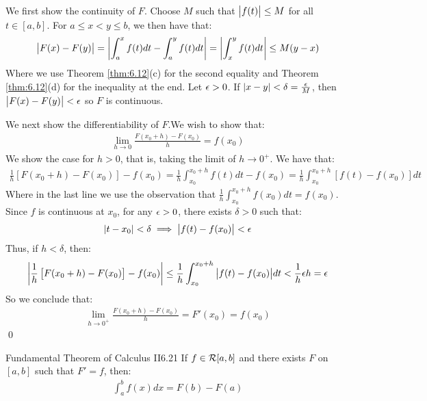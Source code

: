 \begin{nproof}
    We first show the continuity of $F$. Choose $M$ such that $\abs{f(t)} \leq M$ for all $t \in [a, b]$. For $a \leq x < y \leq b$, we then have that:
    \begin{align*}
        \abs{F(x) - F(y)} = \abs{\int_a^xf(t)dt - \int_a^yf(t)dt} = \abs{\int_x^y f(t)dt} \leq M(y - x)
    \end{align*}
    Where we use Theorem \ref{thm:6.12}(c) for the second equality and Theorem \ref{thm:6.12}(d) for the inequality at the end. Let $\epsilon > 0$. If $\abs{x - y} < \delta = \frac{\epsilon}{M}$, then $\abs{F(x) - F(y)} < \epsilon$ so $F$ is continuous.

    We next show the differentiability of $F$.We wish to show that:
    \begin{align*}
        \lim_{h \rightarrow 0} \frac{F(x_0 + h) - F(x_0)}{h} = f(x_0)
    \end{align*}
    We show the case for $h > 0$, that is, taking the limit of $h \rightarrow 0^+$. We have that:
    \begin{align*}
        \frac{1}{h}\left[F(x_0 + h) - F(x_0)\right] - f(x_0) = \frac{1}{h}\int_{x_0}^{x_0 + h}f(t)dt - f(x_0) = \frac{1}{h}\int_{x_0}^{x_0 + h}\left[f(t) - f(x_0)\right]dt
    \end{align*}
    Where in the last line we use the observation that $\frac{1}{h}\int_{x_0}^{x_0 + h}f(x_0)dt = f(x_0)$. Since $f$ is continuous at $x_0$, for any $\epsilon > 0$, there exists $\delta > 0$ such that:
    \begin{align*}
        \abs{t - x_0} < \delta \implies \abs{f(t) - f(x_0)}  <\epsilon
    \end{align*}
    Thus, if $h < \delta$, then:
    \begin{align*}
        \abs{ \frac{1}{h}\left[F(x_0 + h) - F(x_0)\right] - f(x_0)} \leq \frac{1}{h}\int_{x_0}^{x_0 + h}\abs{f(t) - f(x_0)}dt < \frac{1}{h}\epsilon h = \epsilon
    \end{align*}
    So we conclude that:
    \begin{align*}
        \lim_{h \rightarrow 0^+} \frac{F(x_0 + h) - F(x_0)}{h} = F'(x_0) = f(x_0)
    \end{align*}
    \qed
\end{nproof}

\begin{theorem}{Fundamental Theorem of Calculus II}{6.21}
    If $f \in \mathcal{R}[a, b]$ and there exists $F$ on $[a, b]$ such that $F' = f$, then:
    \begin{align*}
        \int_a^b f(x)dx = F(b) - F(a)
    \end{align*}
\end{theorem}

